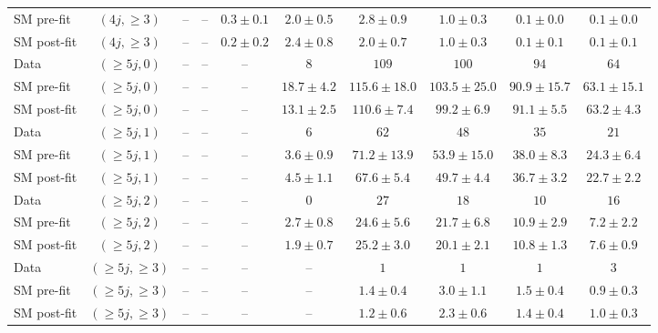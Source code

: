 \begin{table}[h!]
{\begin{tabular}{lccccccccc}
 SM pre-fit  & $(4j,\geq 3)$      & --               & --               & $0.3\pm0.1$    & $2.0\pm0.5$    & $2.8\pm0.9$    & $1.0\pm0.3$    & $0.1\pm0.0$    & $0.1\pm0.0$   \\[0.5ex]
 SM post-fit & $(4j,\geq 3)$      & --               & --               & $0.2\pm0.2$    & $2.4\pm0.8$    & $2.0\pm0.7$    & $1.0\pm0.3$    & $0.1\pm0.1$    & $0.1\pm0.1$   \\[0.5ex]
 Data        & $(\geq 5j,0)$      & --               & --               & --             & $8$            & $109$          & $100$          & $94$           & $64$          \\[0.5ex]
 SM pre-fit  & $(\geq 5j,0)$      & --               & --               & --             & $18.7\pm4.2$   & $115.6\pm18.0$ & $103.5\pm25.0$ & $90.9\pm15.7$  & $63.1\pm15.1$ \\[0.5ex]
 SM post-fit & $(\geq 5j,0)$      & --               & --               & --             & $13.1\pm2.5$   & $110.6\pm7.4$  & $99.2\pm6.9$   & $91.1\pm5.5$   & $63.2\pm4.3$  \\[0.5ex]
 Data        & $(\geq 5j,1)$      & --               & --               & --             & $6$            & $62$           & $48$           & $35$           & $21$          \\[0.5ex]
 SM pre-fit  & $(\geq 5j,1)$      & --               & --               & --             & $3.6\pm0.9$    & $71.2\pm13.9$  & $53.9\pm15.0$  & $38.0\pm8.3$   & $24.3\pm6.4$  \\[0.5ex]
 SM post-fit & $(\geq 5j,1)$      & --               & --               & --             & $4.5\pm1.1$    & $67.6\pm5.4$   & $49.7\pm4.4$   & $36.7\pm3.2$   & $22.7\pm2.2$  \\[0.5ex]
 Data        & $(\geq 5j,2)$      & --               & --               & --             & $0$            & $27$           & $18$           & $10$           & $16$          \\[0.5ex]
 SM pre-fit  & $(\geq 5j,2)$      & --               & --               & --             & $2.7\pm0.8$    & $24.6\pm5.6$   & $21.7\pm6.8$   & $10.9\pm2.9$   & $7.2\pm2.2$   \\[0.5ex]
 SM post-fit & $(\geq 5j,2)$      & --               & --               & --             & $1.9\pm0.7$    & $25.2\pm3.0$   & $20.1\pm2.1$   & $10.8\pm1.3$   & $7.6\pm0.9$   \\[0.5ex]
 Data        & $(\geq 5j,\geq 3)$ & --               & --               & --             & --             & $1$            & $1$            & $1$            & $3$           \\[0.5ex]
 SM pre-fit  & $(\geq 5j,\geq 3)$ & --               & --               & --             & --             & $1.4\pm0.4$    & $3.0\pm1.1$    & $1.5\pm0.4$    & $0.9\pm0.3$   \\[0.5ex]
 SM post-fit & $(\geq 5j,\geq 3)$ & --               & --               & --             & --             & $1.2\pm0.6$    & $2.3\pm0.6$    & $1.4\pm0.4$    & $1.0\pm0.3$   \\[0.5ex]
    \hline
  \end{tabular}
}
\end{table}

